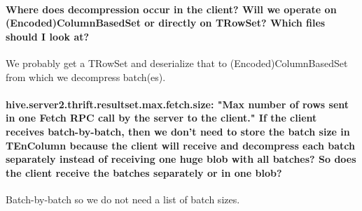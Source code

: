 \documentclass[11pt,a4paper]{article}
\begin{document}
	\paragraph{Where does decompression occur in the client? Will we operate on (Encoded)ColumnBasedSet or directly on TRowSet? Which files should I look at?}
	We probably get a TRowSet and deserialize that to (Encoded)ColumnBasedSet from which we decompress batch(es).
	
	\paragraph{hive.server2.thrift.resultset.max.fetch.size: "Max number of rows sent in one Fetch RPC call by the server to the client." If the client receives batch-by-batch, then we don't need to store the batch size in TEnColumn because the client will receive and decompress each batch separately instead of receiving one huge blob with all batches? So does the client receive the batches separately or in one blob?}
	Batch-by-batch so we do not need a list of batch sizes.
\end{document}
